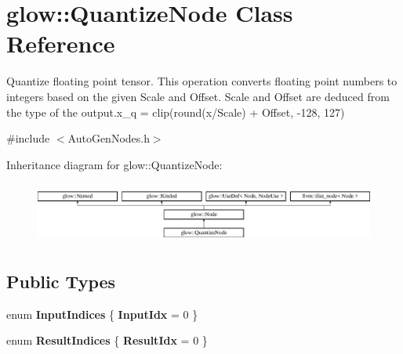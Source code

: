 \hypertarget{classglow_1_1_quantize_node}{}\section{glow\+:\+:Quantize\+Node Class Reference}
\label{classglow_1_1_quantize_node}


Quantize floating point tensor. This operation converts floating point numbers to integers based on the given Scale and Offset. Scale and Offset are deduced from the type of the output.\+x\+\_\+q = clip(round(x/\+Scale) + Offset, -\/128, 127)  




{\ttfamily \#include $<$Auto\+Gen\+Nodes.\+h$>$}

Inheritance diagram for glow\+:\+:Quantize\+Node\+:\begin{figure}[H]
\begin{center}
\leavevmode
\includegraphics[height=2.028986cm]{classglow_1_1_quantize_node}
\end{center}
\end{figure}
\subsection*{Public Types}
\begin{DoxyCompactItemize}
\item 
\mbox{\label{classglow_1_1_quantize_node_a2f57d9a7d3e68ef73e7a732af8d98997}} 
enum {\bfseries Input\+Indices} \{ {\bfseries Input\+Idx} = 0
 \}
\item 
\mbox{\label{classglow_1_1_quantize_node_a0dc9056da58fbaf538037b3af4a68cea}} 
enum {\bfseries Result\+Indices} \{ {\bfseries Result\+Idx} = 0
 \}
\end{DoxyCompactItemize}
